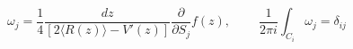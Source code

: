 \begin{equation}
\omega_j = \frac{1}{4} \frac {dz}{[2\langle R(z)\rangle-V'(z)]}
\frac{\partial}
{\partial S_j}f(z),  ~~~~~~~~~~ \frac{1}{2\pi i}
\int_{C_i} \omega_j = \delta_{ij}
\label{basis}
\end{equation} 
